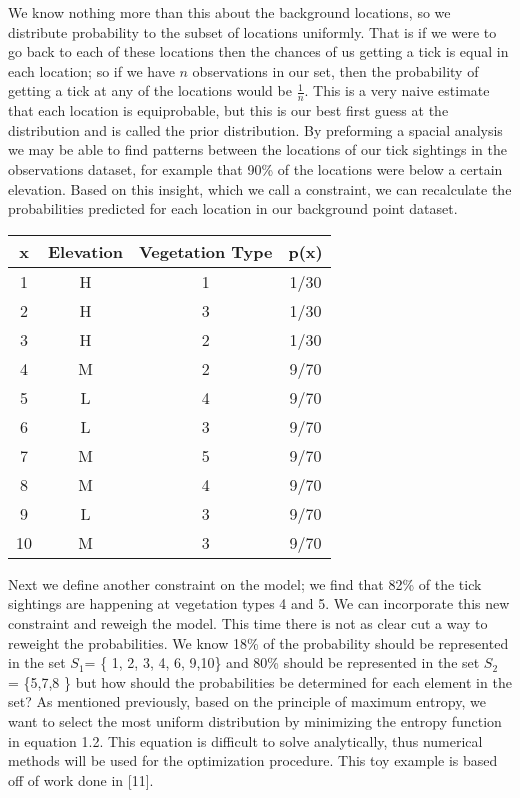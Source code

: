 \noindent We know nothing more than this about the background locations, so we distribute probability to the subset of locations uniformly. That is if we were to go back to each of these locations then the chances of us getting a tick is equal in each location; so if we have $n$ observations in our set, then the probability of getting a tick at any of the locations would be $\frac{1}{n}$. This is a very naive estimate that each location is equiprobable, but this is our best first guess at the distribution and is called the prior distribution. By preforming a spacial analysis we may be able to find patterns between the locations of our tick sightings in the observations dataset, for example that 90\% of the locations were below a certain elevation. Based on this insight, which we call a constraint, we can recalculate the probabilities predicted for each location in our background point dataset. \newline

\begin{center}
 \begin{tabular}{||c c c c||} 
 \hline
 x & Elevation & Vegetation Type & p(x) \\ [0.5ex] 
 \hline\hline
 1 & H &  1& 1/30 \\ 
 \hline
  2 & H & 3 &  1/30\\
 \hline
   3 & H & 2 &  1/30\\
 \hline
 4 & M & 2 & 9/70  \\
 \hline
  5 & L & 4 & 9/70  \\
 \hline
   6 & L & 3 & 9/70 \\
 \hline
  7 & M & 5 & 9/70 \\
 \hline
   8 & M & 4 &  9/70 \\
 \hline
 9 & L & 3 & 9/70 \\
 \hline
   10 & M & 3 & 9/70\\
 \hline
\end{tabular}
\end{center}

\noindent Next we define another constraint on the model; we find that 82\% of the tick sightings are happening at vegetation types 4 and 5. We can incorporate this new constraint and reweigh the model. This time there is not as clear cut a way to reweight the probabilities. We know 18\% of the probability should be represented in the set $S_1$= \{ 1, 2, 3, 4, 6, 9,10\} and 80\% should be represented in the set $S_2$ = \{5,7,8 \} but how should the probabilities be determined for each element in the set? As mentioned previously, based on the principle of maximum entropy, we want to select the most uniform distribution by minimizing the entropy function in equation 1.2. This equation is difficult to solve analytically, thus numerical methods will be used for the optimization procedure. This toy example is based off of work done in [11]. \newline

